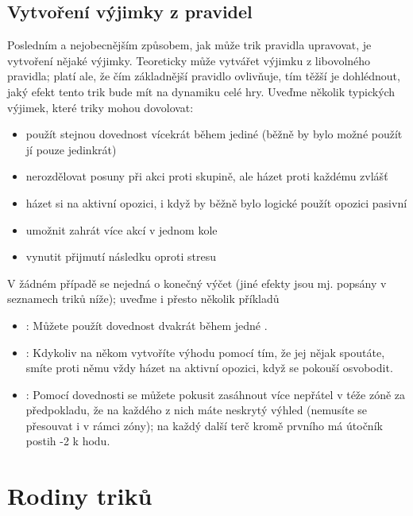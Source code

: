 \subsection{Vytvoření výjimky z pravidel}
\label{sec:trik-vyjimky}
Posledním a nejobecnějším způsobem, jak může trik pravidla upravovat, je vytvoření nějaké výjimky. Teoreticky může vytvářet výjimku z libovolného pravidla; platí ale, že čím základnější pravidlo ovlivňuje, tím těžší je dohlédnout, jaký efekt tento trik bude mít na dynamiku celé hry. Uveďme několik typických výjimek, které triky mohou dovolovat:

\begin{itemize}
\item použít stejnou dovednost vícekrát během jediné  (běžně by bylo možné použít jí pouze jedinkrát)
\item nerozdělovat posuny při akci proti skupině, ale házet proti každému zvlášť
\item házet si na aktivní opozici, i když by běžně bylo logické použít opozici pasivní
\item umožnit zahrát více akcí v jednom kole
\item vynutit přijmutí následku oproti stresu
\end{itemize}

V žádném případě se nejedná o konečný výčet (jiné efekty jsou mj. popsány v seznamech triků níže); uveďme i přesto několik příkladů

\begin{itemize}
\item {}:
  Můžete použít dovednost  dvakrát během jedné .
\item {}:
  Kdykoliv na někom vytvoříte výhodu pomocí  tím, že jej nějak spoutáte, smíte proti němu vždy házet na aktivní opozici, když se pokouší osvobodit.
\item {}:
  Pomocí dovednosti  se můžete pokusit zasáhnout více nepřátel v téže zóně za předpokladu, že na každého z nich máte neskrytý výhled (nemusíte se přesouvat i v rámci zóny); na každý další terč kromě prvního má útočník postih -2 k hodu.
\end{itemize}

\section{Rodiny triků}
\label{sec:trik-rodiny}


